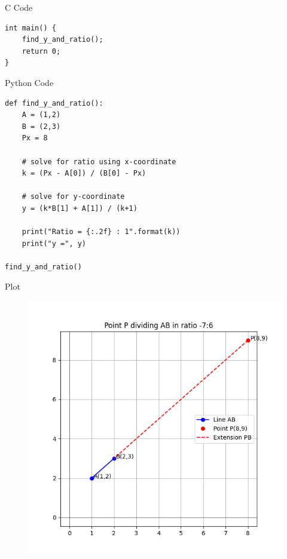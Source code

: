 \documentclass{beamer}
\begin{document}
\begin{frame}[fragile]{C Code}
\begin{verbatim}
int main() {
    find_y_and_ratio();
    return 0;
}
\end{verbatim}
\end{frame}

\begin{frame}[fragile]{Python Code}
\begin{verbatim}
def find_y_and_ratio():
    A = (1,2)
    B = (2,3)
    Px = 8

    # solve for ratio using x-coordinate
    k = (Px - A[0]) / (B[0] - Px)

    # solve for y-coordinate
    y = (k*B[1] + A[1]) / (k+1)

    print("Ratio = {:.2f} : 1".format(k))
    print("y =", y)

find_y_and_ratio()
\end{verbatim}
\end{frame}

\begin{frame}{Plot}
\begin{figure}
    \centering
    \includegraphics[width=0.5\linewidth]{Figs/fig_1.png}
    \caption{}
    \label{fig:fig}
\end{figure}
\end{frame}
\end{document}
